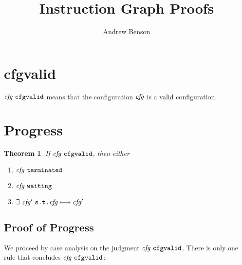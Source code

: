 \documentclass[12pt]{article}
\title{Instruction Graph Proofs}
\author{Andrew Benson}
\date{}
\begin{document}
\maketitle

\thispagestyle{simple}

\newtheorem{thm}{Theorem}

\section{cfgvalid}

$\cfgvalid{\nterm{cfg}}$ means that the configuration $\nterm{cfg}$ is a valid
configuration.

\begin{mathpar}
   
\end{mathpar}

\section{Progress}

\begin{thm}
If $\cfgvalid{\nterm{cfg}}$, then either
\begin{enumerate}
  \item $\terminated{\nterm{cfg}}$
  \item $\waiting{\nterm{cfg}}$
  \item $\exists\ \nterm{cfg'}\ \texttt{s.t.} \steps{\nterm{cfg}}{\nterm{cfg'}}$
\end{enumerate}
\end{thm}

\subsection{Proof of Progress}

We proceed by case analysis on the judgment $\cfgvalid{\nterm{cfg}}$. There is
only one rule that concludes $\cfgvalid{\nterm{cfg}}$:

\begin{mathpar}
\end{mathpar}
\end{document}
